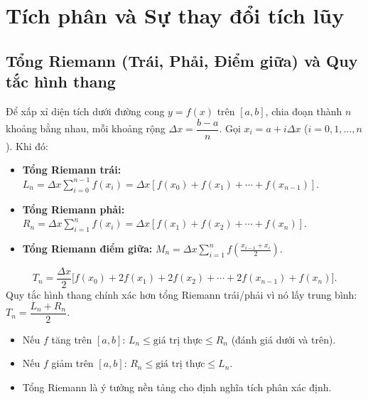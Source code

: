 \documentclass[12pt,a4paper]{article}
\begin{document}
\section{Tích phân và Sự thay đổi tích lũy}

\subsection{Tổng Riemann (Trái, Phải, Điểm giữa) và Quy tắc hình thang}

\begin{dinhnghia}[title={Tổng Riemann}]
  Để xấp xỉ diện tích dưới đường cong $y = f(x)$ trên $[a, b]$, chia đoạn thành $n$ khoảng bằng nhau, mỗi khoảng rộng $\Delta x = \dfrac{b-a}{n}$. Gọi $x_i = a + i\Delta x$ ($i = 0, 1, \ldots, n$). Khi đó:
  \begin{itemize}
    \item \textbf{Tổng Riemann trái:} $L_n = \Delta x \displaystyle\sum_{i=0}^{n-1} f(x_i) = \Delta x[f(x_0) + f(x_1) + \cdots + f(x_{n-1})]$.
    \item \textbf{Tổng Riemann phải:} $R_n = \Delta x \displaystyle\sum_{i=1}^{n} f(x_i) = \Delta x[f(x_1) + f(x_2) + \cdots + f(x_n)]$.
    \item \textbf{Tổng Riemann điểm giữa:} $M_n = \Delta x \displaystyle\sum_{i=1}^{n} f\!\left(\frac{x_{i-1}+x_i}{2}\right)$.
  \end{itemize}
\end{dinhnghia}

\begin{congthuc}[title={Quy tắc hình thang (Trapezoid Rule)}]
  \[
    T_n = \frac{\Delta x}{2}\bigl[f(x_0) + 2f(x_1) + 2f(x_2) + \cdots + 2f(x_{n-1}) + f(x_n)\bigr].
  \]
  Quy tắc hình thang chính xác hơn tổng Riemann trái/phải vì nó lấy trung bình: $T_n = \dfrac{L_n + R_n}{2}$.
\end{congthuc}

\begin{luuy}
  \begin{itemize}
    \item Nếu $f$ tăng trên $[a,b]$: $L_n \le \text{giá trị thực} \le R_n$ (đánh giá dưới và trên).
    \item Nếu $f$ giảm trên $[a,b]$: $R_n \le \text{giá trị thực} \le L_n$.
    \item Tổng Riemann là ý tưởng nền tảng cho định nghĩa tích phân xác định.
  \end{itemize}
\end{luuy}
\end{document}
